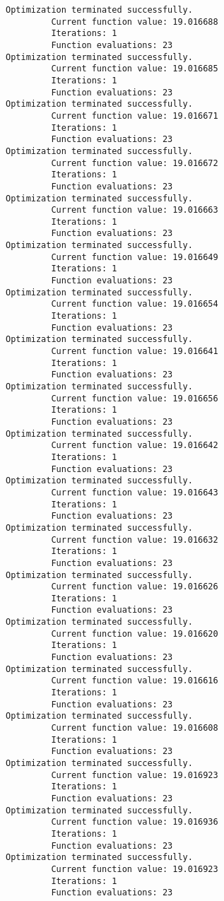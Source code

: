 \documentclass[11pt]{article}
\begin{document}
\begin{Verbatim}[commandchars=\\\{\}]
Optimization terminated successfully.
         Current function value: 19.016688
         Iterations: 1
         Function evaluations: 23
Optimization terminated successfully.
         Current function value: 19.016685
         Iterations: 1
         Function evaluations: 23
Optimization terminated successfully.
         Current function value: 19.016671
         Iterations: 1
         Function evaluations: 23
Optimization terminated successfully.
         Current function value: 19.016672
         Iterations: 1
         Function evaluations: 23
Optimization terminated successfully.
         Current function value: 19.016663
         Iterations: 1
         Function evaluations: 23
Optimization terminated successfully.
         Current function value: 19.016649
         Iterations: 1
         Function evaluations: 23
Optimization terminated successfully.
         Current function value: 19.016654
         Iterations: 1
         Function evaluations: 23
Optimization terminated successfully.
         Current function value: 19.016641
         Iterations: 1
         Function evaluations: 23
Optimization terminated successfully.
         Current function value: 19.016656
         Iterations: 1
         Function evaluations: 23
Optimization terminated successfully.
         Current function value: 19.016642
         Iterations: 1
         Function evaluations: 23
Optimization terminated successfully.
         Current function value: 19.016643
         Iterations: 1
         Function evaluations: 23
Optimization terminated successfully.
         Current function value: 19.016632
         Iterations: 1
         Function evaluations: 23
Optimization terminated successfully.
         Current function value: 19.016626
         Iterations: 1
         Function evaluations: 23
Optimization terminated successfully.
         Current function value: 19.016620
         Iterations: 1
         Function evaluations: 23
Optimization terminated successfully.
         Current function value: 19.016616
         Iterations: 1
         Function evaluations: 23
Optimization terminated successfully.
         Current function value: 19.016608
         Iterations: 1
         Function evaluations: 23
Optimization terminated successfully.
         Current function value: 19.016923
         Iterations: 1
         Function evaluations: 23
Optimization terminated successfully.
         Current function value: 19.016936
         Iterations: 1
         Function evaluations: 23
Optimization terminated successfully.
         Current function value: 19.016923
         Iterations: 1
         Function evaluations: 23

\end{Verbatim}
\end{document}
